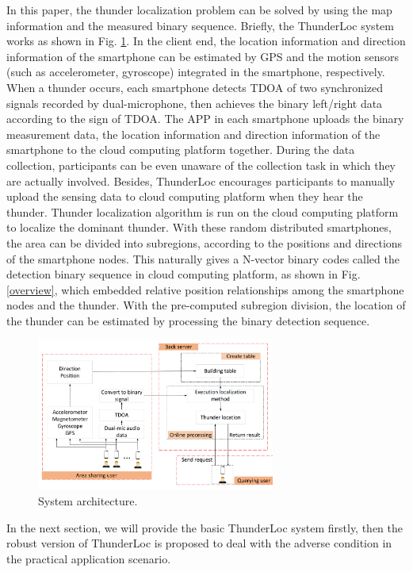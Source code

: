  In this paper, the thunder localization problem can be solved by using the map information and the measured binary sequence.
 Briefly, the ThunderLoc system works as shown in Fig. \ref{architecture}. 
 In the client end, the location information and direction information of the smartphone can be estimated by GPS and the motion sensors (such as accelerometer, gyroscope) integrated in the smartphone, respectively.
 When a thunder occurs, each smartphone detects TDOA of two synchronized signals recorded by dual-microphone, then achieves the binary left/right data according to the sign of TDOA.
 The APP in each smartphone uploads the binary measurement data, the location information and direction information of the smartphone to the cloud computing platform together.
 During the data collection, participants can be even unaware of the collection task in which they are actually involved.
 Besides, ThunderLoc encourages participants to manually upload the sensing data to cloud computing platform when they hear the thunder.
 Thunder localization algorithm is run on the cloud computing platform to localize the dominant thunder.
With these random distributed smartphones, the area can be divided into subregions, according to the positions and directions of the smartphone nodes.
This naturally gives a N-vector binary codes called the detection binary sequence in cloud computing platform,
as shown in Fig. \ref{overview}, which embedded relative position relationships among the smartphone nodes and the thunder. 
With the pre-computed subregion division, the location of the thunder can be estimated by processing the binary detection sequence.
   \vspace{-4mm}
  \begin{figure}[htb]
            \setlength{\abovecaptionskip}{0pt}
            \centering
            \includegraphics[scale=2,height=5.0cm]{fig/architecture.pdf}
			 \vspace{1mm}
            \caption{\label{architecture}System architecture.}
            \vspace{-4mm}
  \end{figure}
  
In the next section, we will provide the basic ThunderLoc system firstly, 
then the robust version of ThunderLoc is proposed to deal with the adverse condition in the practical application scenario.
  




